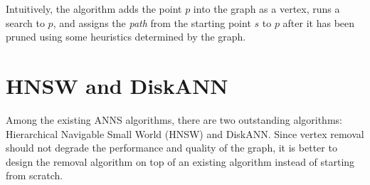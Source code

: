 Intuitively, the algorithm adds the point \(p\) into the graph as a vertex, runs a search to \(p\), and assigns the \textit{path} from the starting point \(s\) to \(p\) after it has been pruned using some heuristics determined by the graph.

\section{HNSW and DiskANN}

Among the existing ANNS algorithms, there are two outstanding algorithms: Hierarchical Navigable Small World (HNSW) and DiskANN. Since vertex removal should not degrade the performance and quality of the graph, it is better to design the removal algorithm on top of an existing algorithm instead of starting from scratch.

